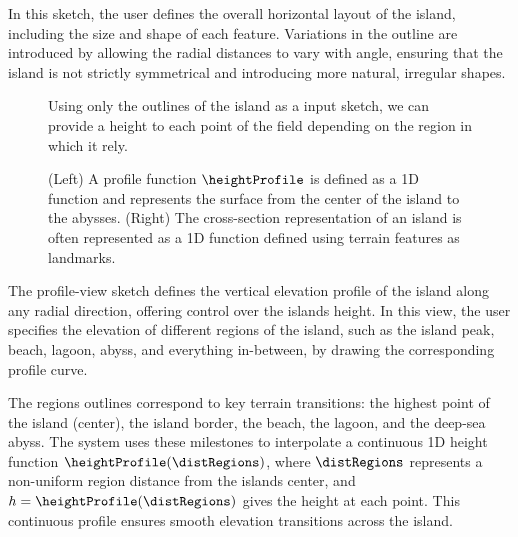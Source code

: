 In this sketch, the user defines the overall horizontal layout of the island, including the size and shape of each feature. Variations in the outline are introduced by allowing the radial distances to vary with angle, ensuring that the island is not strictly symmetrical and introducing more natural, irregular shapes.

\begin{figure}[H]
    \caption{Using only the outlines of the island as a input sketch, we can provide a height to each point of the field depending on the region in which it rely.}
    \label{fig:coral-island_procedural-height-only}
\end{figure}


\begin{figure}[H]
	\centering
    \caption{(Left) A profile function $\heightProfile$ is defined as a 1D function and represents the surface from the center of the island to the abysses. (Right) The cross-section representation of an island is often represented as a 1D function defined using terrain features as landmarks. }
    \label{fig:coral-island_profile-function}
\end{figure}

The profile-view sketch defines the vertical elevation profile of the island along any radial direction, offering control over the islands height. In this view, the user specifies the elevation of different regions of the island, such as the island peak, beach, lagoon, abyss, and everything in-between, by drawing the corresponding profile curve.

The regions outlines correspond to key terrain transitions: the highest point of the island (center), the island border, the beach, the lagoon, and the deep-sea abyss. The system uses these milestones to interpolate a continuous 1D height function $\heightProfile(\distRegions)$, where $\distRegions$ represents a non-uniform region distance from the islands center, and $h = \heightProfile(\distRegions)$ gives the height at each point. This continuous profile ensures smooth elevation transitions across the island.

